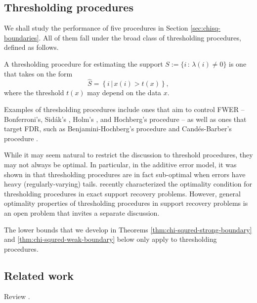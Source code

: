 \subsection{Thresholding procedures}
\label{subsec:thresholding-procedures}

We shall study the performance of five procedures in Section \ref{sec:chisq-boundaries}.
All of them fall under the broad class of thresholding procedures, defined as follows.
\begin{definition}
A thresholding procedure for estimating the support 
$S:=\{i\, :\, \lambda(i)\neq0\}$ is one that takes on the form
\begin{equation} \label{eq:thresholding-procedure}
    \widehat{S} = \left\{i\,|\,x(i) > t(x)\right\},
\end{equation}
where the threshold $t(x)$ may depend on the data $x$.
\end{definition}
Examples of thresholding procedures include ones that aim to control FWER -- Bonferroni's, Sid\'ak's \citep{vsidak1967rectangular}, Holm's \citep{holm1979simple}, and Hochberg's procedure \citep{hochberg1988sharper} -- as well as ones that target FDR, such as Benjamini-Hochberg's procedure \cite{benjamini1995controlling} and Cand\'es-Barber's procedure \cite{barber2015controlling}.

While it may seem natural to restrict the discussion to threshold procedures, they may not always be optimal.
In particular, in the additive error model, it was shown in \cite{chen2018scan} that thresholding procedures are in fact sub-optimal when errors have heavy (regularly-varying) tails.
\citet{gao2018fundamental} recently characterized the optimality condition for thresholding procedures in exact support recovery problems.
However, general optimality properties of thresholding procedures in support recovery problems is an open problem that invites a separate discussion.

The lower bounds that we develop in Theorems \ref{thm:chi-squred-strong-boundary} and \ref{thm:chi-squred-weak-boundary} below only apply to thresholding procedures.

\subsection{Related work}

Review \cite{jin2014optimality, jin2016rare, butucea2018variable, arias2017distribution, gao2018fundamental, ji2012ups, rabinovich2017optimal}.

